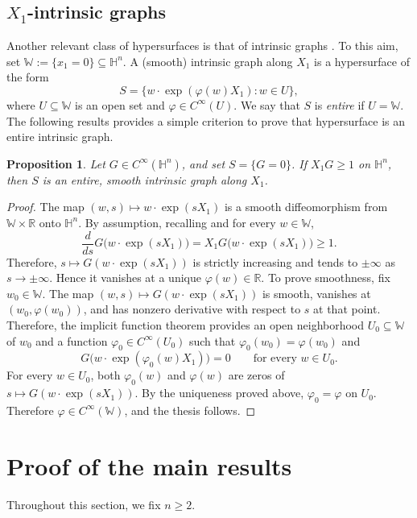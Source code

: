 \documentclass[11pt]{amsart}
\renewcommand{\geq}{\geqslant}
\newcommand{\hh}{{\mathbb{H}}}
\newtheorem{proposition}[theorem]{Proposition}
\theoremstyle{definition}
\theoremstyle{remark}
\numberwithin{equation}{section}
\begin{document}
\subsection{$X_1$-intrinsic graphs}
Another relevant class of hypersurfaces is that of intrinsic graphs \cite{MR1871966}. To this aim, set $\mathbb{W}:=\{x_1=0\}\subseteq\hh^n$. A (smooth) intrinsic
graph along $X_1$ is a hypersurface of the form
\[
    S=\{w\cdot\exp(\varphi(w)X_1):w\in U\},
\]
where $U\subseteq\mathbb{W}$ is an open set and
$\varphi\in C^\infty(U)$. We say that $S$ is \emph{entire} if
$U=\mathbb{W}$.
The following results provides a simple criterion to prove that hypersurface is an entire intrinsic graph.
\begin{proposition}\label{propcriteriointrinsic}
Let $G\in C^\infty(\hh^n)$, and set 
$S=\{G=0\}$. If $X_1G\geqslant 1$ on $\hh^n$, then $S$ is an entire, smooth intrinsic graph along $X_1$.
\end{proposition}
\begin{proof}
The map $(w,s)\mapsto w\cdot\exp(sX_1)$ is a smooth diffeomorphism
from $\mathbb{W}\times\mathbb{R}$ onto $\hh^n$. By assumption, recalling \cite[Lemma 2.12.1]{MR746308} and for every
$w\in\mathbb{W}$,
\[
    \frac{d}{ds}G\bigl(w\cdot\exp(sX_1)\bigr)
    =X_1G\bigl(w\cdot\exp(sX_1)\bigr)\geqslant 1.
\]
Therefore, $s\mapsto G(w\cdot\exp(sX_1))$ is strictly increasing
and tends to $\pm\infty$ as $s\to\pm\infty$. Hence it vanishes at
a unique $\varphi(w)\in\mathbb{R}$. To prove smoothness, fix $w_0\in\mathbb{W}$. The map
$(w,s)\mapsto G(w\cdot\exp(sX_1))$ is smooth, vanishes at
$(w_0,\varphi(w_0))$, and has nonzero derivative with respect to
$s$ at that point. Therefore, the implicit function theorem
provides an open neighborhood $U_0\subseteq\mathbb{W}$ of $w_0$
and a function $\varphi_0\in C^\infty(U_0)$ such that
$\varphi_0(w_0)=\varphi(w_0)$ and
\[
    G\bigl(w\cdot\exp(\varphi_0(w)X_1)\bigr)=0
    \qquad\text{for every }w\in U_0.
\]
For every $w\in U_0$, both $\varphi_0(w)$ and $\varphi(w)$
are zeros of $s\mapsto G(w\cdot\exp(sX_1))$. By the uniqueness
proved above, $\varphi_0=\varphi$ on $U_0$. Therefore
$\varphi\in C^\infty(\mathbb{W})$, and the thesis follows.
\end{proof}

\section{Proof of the main results}
Throughout this section, we fix $n\geq 2$.
\end{document}
